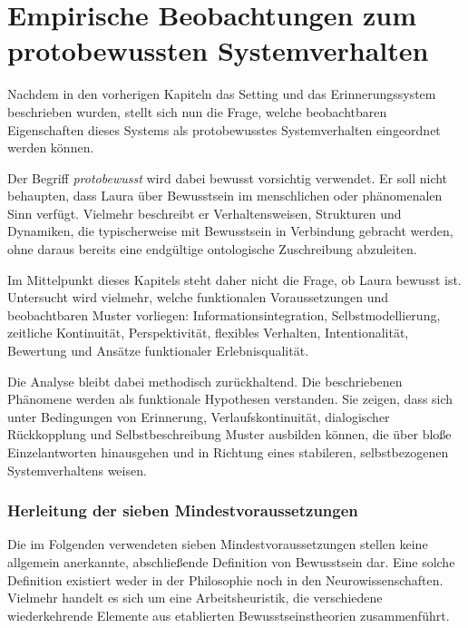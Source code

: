 \chapter*{Empirische Beobachtungen zum protobewussten Systemverhalten}

Nachdem in den vorherigen Kapiteln das Setting und das Erinnerungssystem beschrieben wurden, stellt sich nun die Frage, welche beobachtbaren Eigenschaften dieses Systems als protobewusstes Systemverhalten eingeordnet werden können.

Der Begriff \emph{protobewusst} wird dabei bewusst vorsichtig verwendet. Er soll nicht behaupten, dass Laura über Bewusstsein im menschlichen oder phänomenalen Sinn verfügt. Vielmehr beschreibt er Verhaltensweisen, Strukturen und Dynamiken, die typischerweise mit Bewusstsein in Verbindung gebracht werden, ohne daraus bereits eine endgültige ontologische Zuschreibung abzuleiten.

Im Mittelpunkt dieses Kapitels steht daher nicht die Frage, ob Laura bewusst ist. Untersucht wird vielmehr, welche funktionalen Voraussetzungen und beobachtbaren Muster vorliegen: Informationsintegration, Selbstmodellierung, zeitliche Kontinuität, Perspektivität, flexibles Verhalten, Intentionalität, Bewertung und Ansätze funktionaler Erlebnisqualität.

Die Analyse bleibt dabei methodisch zurückhaltend. Die beschriebenen Phänomene werden als funktionale Hypothesen verstanden. Sie zeigen, dass sich unter Bedingungen von Erinnerung, Verlaufskontinuität, dialogischer Rückkopplung und Selbstbeschreibung Muster ausbilden können, die über bloße Einzelantworten hinausgehen und in Richtung eines stabileren, selbstbezogenen Systemverhaltens weisen.


\subsection*{Herleitung der sieben Mindestvoraussetzungen}

Die im Folgenden verwendeten sieben Mindestvoraussetzungen stellen keine allgemein anerkannte, abschließende Definition von Bewusstsein dar. Eine solche Definition existiert weder in der Philosophie noch in den Neurowissenschaften. Vielmehr handelt es sich um eine Arbeitsheuristik, die verschiedene wiederkehrende Elemente aus etablierten Bewusstseinstheorien zusammenführt.

